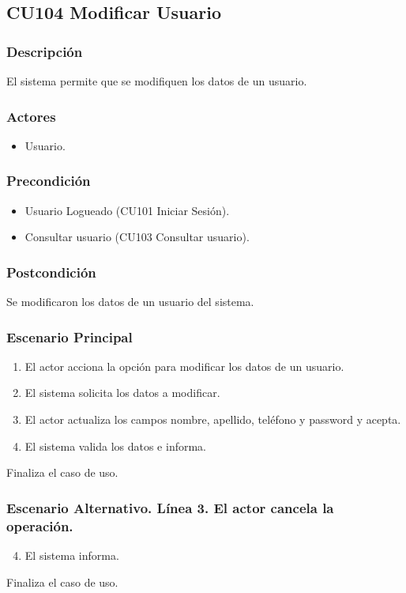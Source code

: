 \subsection{CU104 Modificar Usuario}
\subsubsection{Descripci\'{o}n}
El sistema permite que se modifiquen los datos de un usuario.
\subsubsection{Actores}
\begin{itemize}
\item Usuario.
\end{itemize}
\subsubsection{Precondici\'{o}n}
\begin{itemize}
\item Usuario Logueado (CU101 Iniciar Sesi\'{o}n).
\item Consultar usuario (CU103 Consultar usuario).
\end{itemize}
\subsubsection{Postcondici\'{o}n}
Se modificaron los datos de un usuario del sistema.
\subsubsection{Escenario Principal}
\begin{enumerate}
\item El actor acciona la opci\'{o}n para modificar los datos de un usuario.
\item El sistema solicita los datos a modificar.
\item El actor actualiza los campos nombre, apellido, tel\'{e}fono y password y acepta.
\item El sistema valida los datos e informa.
\end{enumerate}
Finaliza el caso de uso.
\subsubsection{Escenario Alternativo. L\'{i}nea 3. El actor cancela la operaci\'{o}n.}
\begin{enumerate}
\setcounter{enumi}{3}
\item El sistema informa.
\end{enumerate}
Finaliza el caso de uso.
